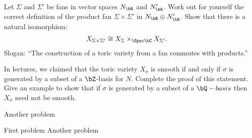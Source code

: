 \begin{homework}[e]
	\prob Let $\Sigma$ and $\Sigma'$ be fans in vector spaces $N_\bR$ and $N_\bR'$. Work out for yourself the correct definition of the product fan $\Sigma\times \Sigma'$ in $N_\bR \oplus N_\bR'$. Show that there is a natural isomorphism:
	\begin{align*}
		X_{\Sigma\times \Sigma'} \cong X_\Sigma \times_{\Spec \bC} X_{\Sigma'}.
	\end{align*}
	Slogan: ``The construction of a toric variety from a fan commutes with products.''

	\prob In lectures, we claimed that the toric variety $X_\sigma$ is smooth if and only if $\sigma$ is generated by a subset of a $\bZ$-basis for $N$. Complete the proof of this statement. Give an example to show that if $\sigma$ is generated by a subset of a $\bQ-basis$ then $X_\sigma$ need not be smooth.

	 Another problem
\end{homework}

\begin{homework}[e]
	\prob First problem
	 Another problem
\end{homework}



